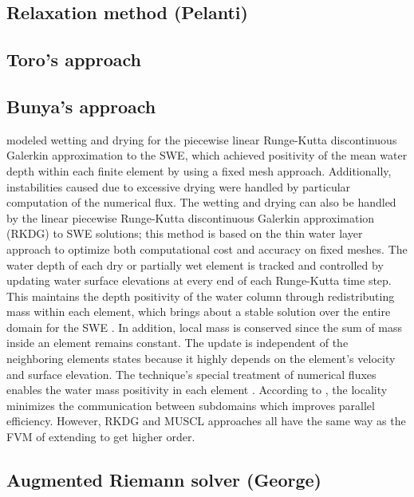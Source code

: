 \documentclass[11pt,a4paper]{article}
\begin{document}
	\subsection{Relaxation method (Pelanti)}

	\subsection{Toro's approach}

	\subsection{Bunya's approach}

				\citet{bu-ku-we-da:2009} modeled wetting and drying for the piecewise linear Runge-Kutta discontinuous Galerkin approximation to the SWE, which achieved positivity of the mean water depth within each finite element by using a fixed mesh approach. Additionally, instabilities caused due to excessive drying were handled by particular computation of the numerical flux.   
		The wetting and drying can also be handled by the linear piecewise  Runge-Kutta discontinuous Galerkin approximation (RKDG)  to SWE solutions; this method is based on the thin water layer approach to optimize both computational cost and accuracy on fixed meshes. The water depth of each dry or partially wet element is tracked and controlled by updating water surface elevations at every end of each Runge-Kutta time step. This maintains the depth positivity of the water column through redistributing mass within each element, which brings about a stable solution over the entire domain for the SWE \cite{bu-ku-we-da:2009}. In addition, local mass is conserved since the sum of mass inside an element remains constant. The update is independent of the neighboring elements states because it highly depends on the element's velocity and surface elevation. The technique's special treatment of numerical fluxes enables the water mass positivity in each element \cite{bu-ku-we-da:2009,kubatko2007semi}. According to \citet{bokhove2005flooding,bu-ku-we-da:2009}, the locality minimizes the communication between subdomains which improves parallel efficiency. However, RKDG and MUSCL approaches all have  the same way as the FVM of extending to get higher order. 


	\subsection{Augmented Riemann solver (George)}
\end{document}
